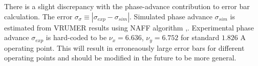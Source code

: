 There is a slight discrepancy with the phase-advance contribution to error bar calculation. 
The error $\sigma_\sigma \equiv | \sigma_{exp} - \sigma_{sim}|$. Simulated phase advance $\sigma_{sim}$ is estimated from VRUMER results using NAFF algorithm \cite{Laskar2003},\cite{Pedro2012}. Experimental phase advance $\sigma_{exp}$ is hard-coded to be $\nu_x = 6.636$, $\nu_y = 6.752$ for standard $1.826$ A operating point.  This will result in erroneaously large error bars for different operating points and should be modified in the future to be more general.







